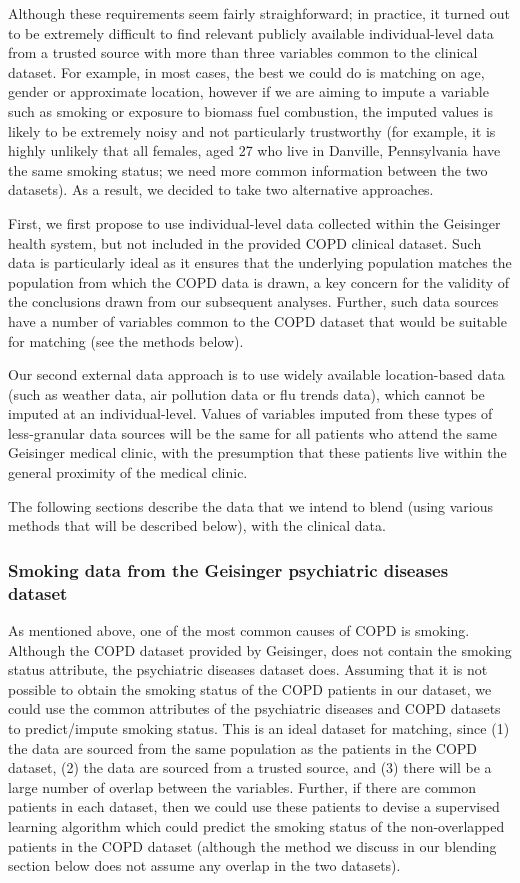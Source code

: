 \documentclass{article}
\begin{document}
Although these requirements seem fairly straighforward; in practice, it turned out to be extremely difficult to find relevant publicly available individual-level data from a trusted source with more than three variables common to the clinical dataset. For example, in most cases, the best we could do is matching on age, gender or approximate location, however if we are aiming to impute a variable such as smoking or exposure to biomass fuel combustion, the imputed values is likely to be extremely noisy and not particularly trustworthy (for example, it is highly unlikely that all females, aged 27 who live in Danville, Pennsylvania have the same smoking status; we need more common information between the two datasets). As a result, we decided to take two alternative approaches. 

First, we first propose to use individual-level data collected within the Geisinger health system, but not included in the provided COPD clinical dataset. Such data is particularly ideal as it ensures that the underlying population matches the population from which the COPD data is drawn, a key concern for the validity of the conclusions drawn from our subsequent analyses. Further, such data sources have a number of variables common to the COPD dataset that would be suitable for matching (see the methods below).

Our second external data approach is to use widely available location-based data (such as weather data, air pollution data or flu trends data), which cannot be imputed at an individual-level. Values of variables imputed from these types of less-granular data sources will be the same for all patients who attend the same Geisinger medical clinic, with the presumption that these patients live within the general proximity of the medical clinic.

The following sections describe the data that we intend to blend (using various methods that will be described below), with the clinical data.

\subsubsection{Smoking data from the Geisinger psychiatric diseases dataset}

As mentioned above, one of the most common causes of COPD is smoking. Although the COPD dataset provided by Geisinger, does not contain the smoking status attribute, the psychiatric diseases dataset does. Assuming that it is not possible to obtain the smoking status of the COPD patients in our dataset, we could use the common attributes of the psychiatric diseases and COPD datasets to predict/impute smoking status. This is an ideal dataset for matching, since (1) the data are sourced from the same population as the patients in the COPD dataset, (2) the data are sourced from a trusted source, and (3) there will be a large number of overlap between the variables. Further, if there are common patients in each dataset, then we could use these patients to devise a supervised learning algorithm which could predict the smoking status of the non-overlapped patients in the COPD dataset (although the method we discuss in our blending section below does not assume any overlap in the two datasets).
\end{document}
